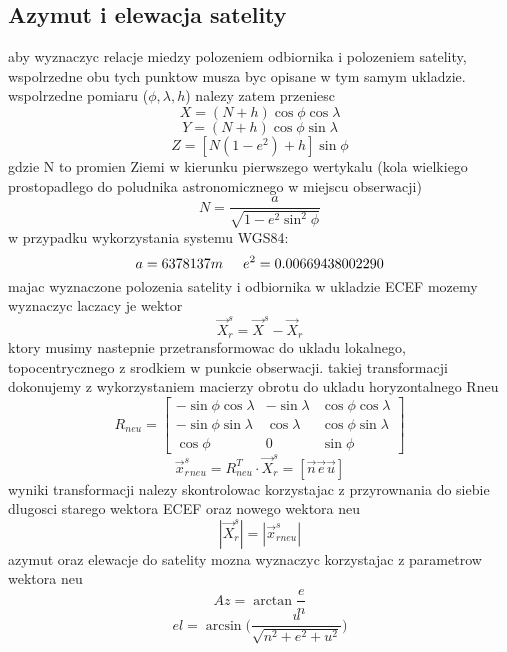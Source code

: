 \documentclass[twocolumn]{article}
\begin{document}
\subsection{Azymut i elewacja satelity}
aby wyznaczyc relacje miedzy polozeniem odbiornika i polozeniem satelity, wspolrzedne obu tych punktow musza byc opisane w tym samym ukladzie. wspolrzedne pomiaru (\(\phi,\lambda,h\)) nalezy zatem przeniesc
\begin{equation}
X=(N+h)\cos{\phi}\cos{\lambda}
\end{equation}
\begin{equation}
Y=(N+h)\cos{\phi}\sin{\lambda}
\end{equation}
\begin{equation}
Z=[N(1-e^2)+h]\sin{\phi}
\end{equation}
gdzie N to promien Ziemi w kierunku pierwszego wertykalu (kola wielkiego prostopadlego do poludnika astronomicznego w miejscu obserwacji)
\begin{equation}
N=\frac{a}{\sqrt{1-e^2\sin^2{\phi}}}
\end{equation}
w przypadku wykorzystania systemu WGS84:
\begin{equation}
a=6378137m\hspace{0.5cm}e^2=0.00669438002290
\end{equation}
majac wyznaczone polozenia satelity i odbiornika w ukladzie ECEF mozemy wyznaczyc laczacy je wektor
\begin{equation}
\vec{X}^s_r=\vec{X}^s-\vec{X}_r
\end{equation}
ktory musimy nastepnie przetransformowac do ukladu lokalnego, topocentrycznego z srodkiem w punkcie obserwacji. takiej transformacji dokonujemy z wykorzystaniem macierzy obrotu do ukladu horyzontalnego Rneu
\begin{equation}
R_{neu}=
\begin{bmatrix} 
  -\sin{\phi}\cos{\lambda} & -\sin{\lambda} & \cos{\phi}\cos{\lambda}\\ 
  -\sin{\phi}\sin{\lambda} & \cos{\lambda} & \cos{\phi}\sin{\lambda}\\
  \cos{\phi} & 0 & \sin{\phi}
\end{bmatrix}
\end{equation}
\begin{equation}
\vec{x}^s_r_{neu}=R^T_{neu}\cdot\vec{X}^s_r=[\vec{n}\vec{e}\vec{u}]
\end{equation}
wyniki transformacji nalezy skontrolowac korzystajac z przyrownania do siebie dlugosci starego wektora ECEF oraz nowego wektora neu
\begin{equation}
|\vec{X}^s_r|=|\vec{x}^s_{rneu}|
\end{equation}
azymut oraz elewacje do satelity mozna wyznaczyc korzystajac z parametrow wektora neu
\begin{equation}
Az=\arctan{\frac{e}{n}}
\end{equation}
\begin{equation}
el=\arcsin{\Big(\frac{u}{\sqrt{n^2+e^2+u^2}}\Big)}
\end{equation}
\end{document}

